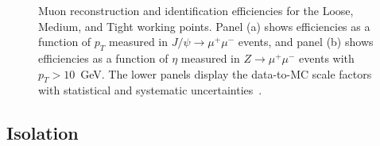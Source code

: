 \begin{figure}[htbp]
  \centering
  \hfill
  \caption{Muon reconstruction and identification efficiencies for the Loose, Medium, and Tight working points. Panel (a) shows efficiencies as a function of $p_T$ measured in $J/\psi \to \mu^+\mu^-$ events, and panel (b) shows efficiencies as a function of $\eta$ measured in $Z \to \mu^+\mu^-$ events with $p_T>10$~GeV. The lower panels display the data-to-MC scale factors with statistical and systematic uncertainties~\cite{muon_reco_run2}.}
  \label{fig:muon_eff}
\end{figure}

\subsection*{Isolation} 

